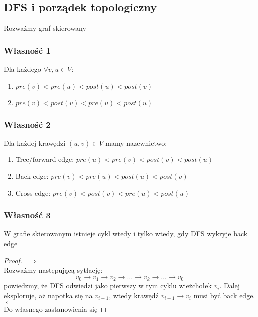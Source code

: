 \documentclass[11pt,a4paper]{article}
\begin{document}
\subsection{DFS i porządek topologiczny}
Rozważmy graf skierowany

\subsubsection{Własność 1}
Dla każdego $\forall v,u \in V$:
\begin{enumerate}
    \item $pre(v)<pre(u)<post(u)<post(v)$
    \item $pre(v)<post(v)<pre(u)<post(u)$
\end{enumerate}
\subsubsection{Własność 2}
Dla każdej krawędzi $(u,v) \in V$ mamy nazewnictwo:
\begin{enumerate}
    \item Tree/forward edge: $pre(u)<pre(v)<post(v)<post(u)$
    \item Back edge: $pre(v)<pre(u)<post(u)<post(v)$
    \item Cross edge: $pre(v)<post(v)<pre(u)<post(u)$
\end{enumerate}
\subsubsection{Własność 3}
W grafie skierowanym istnieje cykl wtedy i tylko wtedy, gdy DFS wykryje back edge
\begin{proof}
    $\implies$\\
    Rozważmy następującą sytłację:
    \[
        v_0 \to v_1 \to v_2 \to \dots \to v_k \to \dots \to v_0
    \]
    powiedzmy, że DFS odwiedzi jako pierwszy w tym cyklu wieżchołek $v_i$. Dalej eksploruje, aż napotka się na $v_{i-1}$, wtedy krawędź $v_{i-1} \to v_i$ musi być back edge.
    \bigskip
    $\impliedby$\\
    Do własnego zastanowienia się
\end{proof}
\end{document}
